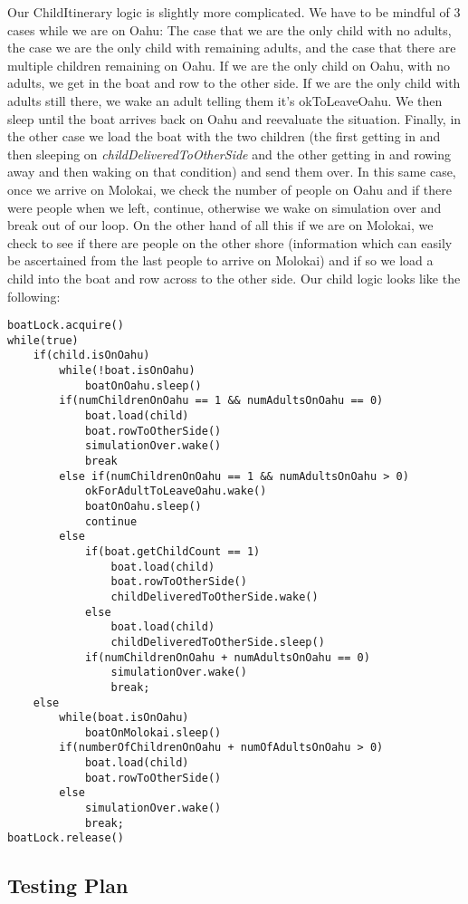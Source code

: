 \documentclass{article}
\begin{document}
Our ChildItinerary logic is slightly more complicated. We have to be mindful of 3 cases while we are on Oahu: The case
that we are the only child with no adults, the case we are the only child with remaining adults, and the case that there
are multiple children remaining on Oahu. If we are the only child on Oahu, with no adults, we get in the boat and row to
the other side. If we are the only child with adults still there, we wake an adult telling them it's okToLeaveOahu.
We then sleep until the boat arrives back on Oahu and reevaluate the situation. Finally, in the other case we load the
boat with the two children (the first getting in and then sleeping on \textit{childDeliveredToOtherSide} and the other
getting in and rowing away and then waking on that condition) and send them over. In this same case, once we arrive on
Molokai, we check the number of people on Oahu and if there were people when we left, continue, otherwise we wake on
simulation over and break out of our loop. On the other hand of all this if we are on Molokai, we check to see if there
are people on the other shore (information which can easily be ascertained from the last people to arrive on Molokai)
and if so we load a child into the boat and row across to the other side. Our child logic looks like the following:
\begin{lstlisting}
boatLock.acquire()
while(true)
    if(child.isOnOahu)
        while(!boat.isOnOahu)
            boatOnOahu.sleep()
        if(numChildrenOnOahu == 1 && numAdultsOnOahu == 0)
            boat.load(child)
            boat.rowToOtherSide()
            simulationOver.wake()
            break
        else if(numChildrenOnOahu == 1 && numAdultsOnOahu > 0)
            okForAdultToLeaveOahu.wake()
            boatOnOahu.sleep()
            continue
        else
            if(boat.getChildCount == 1)
                boat.load(child)
                boat.rowToOtherSide()
                childDeliveredToOtherSide.wake()
            else
                boat.load(child)
                childDeliveredToOtherSide.sleep()
            if(numChildrenOnOahu + numAdultsOnOahu == 0)
                simulationOver.wake()
                break;
    else
        while(boat.isOnOahu)
            boatOnMolokai.sleep()
        if(numberOfChildrenOnOahu + numOfAdultsOnOahu > 0)
            boat.load(child)
            boat.rowToOtherSide()
        else
            simulationOver.wake()
            break;
boatLock.release()
\end{lstlisting}
\subsection*{Testing Plan}
\end{document}
